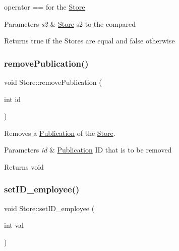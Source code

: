 operator == for the \hyperlink{class_store}{Store} 


\begin{DoxyParams}{Parameters}
{\em s2} & \hyperlink{class_store}{Store} s2 to the compared\\
\hline
\end{DoxyParams}
\begin{DoxyReturn}{Returns}
true if the Stores are equal and false otherwise 
\end{DoxyReturn}
\mbox{\label{class_store_a64f322bc111e0e88ab0995cd86718f0d}} 
\subsubsection{\texorpdfstring{remove\+Publication()}{removePublication()}}
{\footnotesize\ttfamily void Store\+::remove\+Publication (\begin{DoxyParamCaption}\item[{int}]{id }\end{DoxyParamCaption})}



Removes a \hyperlink{class_publication}{Publication} of the \hyperlink{class_store}{Store}. 


\begin{DoxyParams}{Parameters}
{\em id} & \hyperlink{class_publication}{Publication} ID that is to be removed\\
\hline
\end{DoxyParams}
\begin{DoxyReturn}{Returns}
void 
\end{DoxyReturn}
\mbox{\label{class_store_a2d721f632d90947fae8c9eaa9f8abfcb}} 
\subsubsection{\texorpdfstring{set\+I\+D\+\_\+employee()}{setID\_employee()}}
{\footnotesize\ttfamily void Store\+::set\+I\+D\+\_\+employee (\begin{DoxyParamCaption}\item[{int}]{val }\end{DoxyParamCaption})}



